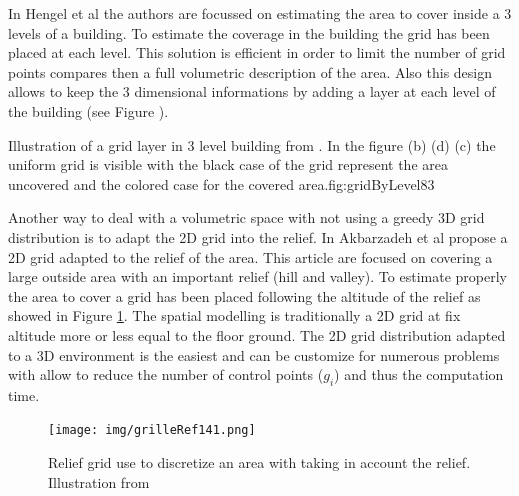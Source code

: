 In  Hengel et al\cite{83*van2009} the authors are focussed on estimating the area to cover inside a 3 levels of a building. To estimate the coverage in the building the grid has been placed at each level. This solution is efficient in order to limit the number of grid points compares then a full volumetric description of the area. Also this design allows to keep the 3 dimensional informations by adding a layer at each level of the building (see Figure ). 
 \begin{mfigures}[!]{Illustration of a grid layer in 3 level building from \citep{83*van2009}. In the figure (b) (d) (c) the uniform grid is visible with the black case of the grid represent the area uncovered and the colored case for the covered area.}{fig:gridByLevel83} \centering

\hspace{1cm}
\hspace{1cm}
\hspace{1cm}


\end{mfigures} 

Another way to deal with a volumetric space with not using a greedy 3D grid distribution is to adapt the 2D grid into the relief. In Akbarzadeh et al\citep{141*akbarzadeh2013} propose a 2D grid adapted to the relief of the area. This article are focused on covering a large outside area with an important relief (hill and valley). To estimate properly the area to cover a grid has been placed following the altitude of the relief as showed in Figure \ref{fig:grilleRef141}. The spatial modelling is traditionally a 2D grid at fix altitude more or less equal to the floor ground. 
The 2D grid distribution adapted to a 3D environment is the easiest and can be customize for numerous problems with allow to reduce the number of control points ($g_i$) and thus  the computation time.  

\begin{figure}[t!]
\begin{center}
   \texttt{[image: img/grilleRef141.png]}
  \caption{Relief grid use to discretize  an area with taking in account the relief. Illustration from \cite{141*akbarzadeh2013} }\label{fig:grilleRef141}
  \endminipage\hfill
  \end{center}
\end{figure}

